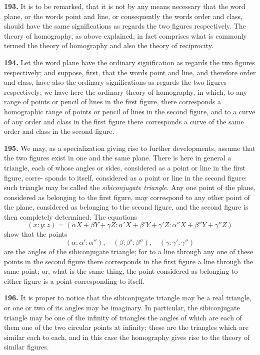 \documentclass[11pt,a4paper]{article}
\begin{document}
\textbf{193.} It is to be remarked, that it is not by any means necessary that the word
plane, or the words point and line, or consequently the words order and class, should
have the same significations as regards the two figures respectively. The theory of
homography, as above explained, in fact comprises what is commonly termed the theory
of homography and also the theory of reciprocity.

\textbf{194.} Let the word plane have the ordinary signification as regards the two figures
respectively; and suppose, first, that the words point and line, and therefore order
and class, have also the ordinary significations as regards the two figures respectively;
we have here the ordinary theory of homography, in which, to any range of points
or pencil of lines in the first figure, there corresponds a homographic range of points
or pencil of lines in the second figure, and to a curve of any order and class in the
first figure there corresponds a curve of the same order and class in the second figure.

\textbf{195.} We may, as a specialization giving rise to further developments, assume that
the two figures exist in one and the same plane. There is here in general a triangle,
each of whose angles or sides, considered as a point or line in the first figure, corre-
sponds to itself, considered as a point or line in the second figure: such triangle may
be called the \textit{sibiconjugate triangle}. Any one point of the plane, considered as belonging
to the first figure, may correspond to any other point of the plane, considered as
belonging to the second figure, and the second figure is then completely determined.
The equations
\[
(x:y:z) = (\alpha X+\beta Y+\gamma Z : \alpha' X+\beta' Y+\gamma' Z : \alpha'' X+\beta'' Y+\gamma'' Z)
\]
show that the points
\[
(\alpha:\alpha':\alpha''),\quad (\beta:\beta':\beta''),\quad (\gamma:\gamma':\gamma'')
\]
are the angles of the sibiconjugate triangle; for to a line through any one of these
points in the second figure there corresponds in the first figure a line through the same
point; or, what is the same thing, the point considered as belonging to either figure
is a point corresponding to itself.

\textbf{196.} It is proper to notice that the sibiconjugate triangle may be a real triangle,
or one or two of its angles may be imaginary. In particular, the sibiconjugate triangle
may be one of the infinity of triangles the angles of which are each of them one of the
two circular points at infinity; these are the triangles which are similar each to each,
and in this case the homography gives rise to the theory of similar figures.
\end{document}

